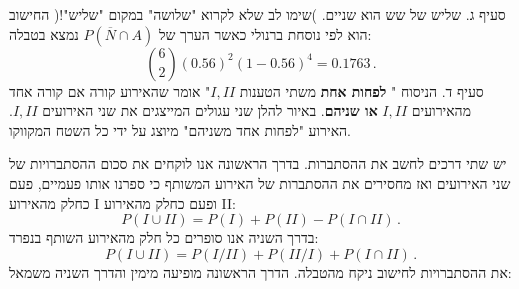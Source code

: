 \documentclass[12pt,a4paper]{article}
\begin{document}
סעיף ג. שליש של שש הוא שניים. )שימו לב שלא לקרוא "שלושה" במקום "שליש"!( החישוב הוא לפי נוסחת ברנולי כאשר הערך של
$P(\overline{N}\cap A)$
נמצא בטבלה:
\[
{6 \choose 2}(0.56)^2 (1-0.56)^4=0.1763\,.
\]
סעיף ד. הניסוח "%
\textbf{לפחות אחת}
משתי הטענות
$I, II$"
אומר שהאירוע קורה אם קורה אחד מהאירועים
$I, II$
\textbf{או שניהם}.
באיור להלן שני עגולים המייצגים את שני האירועים
$I, II$.
האירוע "לפחות אחד משניהם" מיוצג על ידי כל השטח המקווקו.
\begin{center}
\end{center}
יש שתי דרכים לחשב את ההסתברות. בדרך הראשונה אנו לוקחים את סכום ההסתברויות של שני האירועים ואז מחסירים את ההסתברות של האירוע המשותף כי ספרנו אותו פעמיים, פעם כחלק מהאירוע I ופעם כחלק מהאירוע II:
\[
P(I \cup II) = P(I) + P(II) - P(I \cap II)\,.
\]
בדרך השניה אנו סופרים כל חלק מהאירוע השותף בנפרד:
\[
P(I \cup II) = P(I/ II) + P(II/ I) + P(I \cap II)\,.
\]
את ההסתברויות לחישוב ניקח מהטבלה. הדרך הראשונה מופיעה מימין והדרך השניה משמאל:
\end{document}
